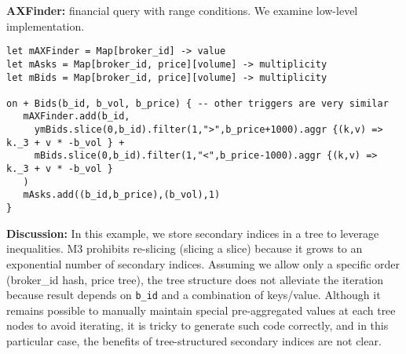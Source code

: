 \documentclass[10pt]{article}
\newlength{\dlen}
\def\discuss#1{\par\hspace{2em}
\setlength{\dlen}{\textwidth}
\addtolength{\dlen}{-2em}
\begin{minipage}{\dlen}\footnotesize {\bf\color{red} Discussion:} #1\end{minipage}\par}
\begin{document}
\textbf{AXFinder:} financial query with range conditions. We examine low-level implementation.
\begin{verbatim}
let mAXFinder = Map[broker_id] -> value
let mAsks = Map[broker_id, price][volume] -> multiplicity
let mBids = Map[broker_id, price][volume] -> multiplicity

on + Bids(b_id, b_vol, b_price) { -- other triggers are very similar
   mAXFinder.add(b_id, 
     ymBids.slice(0,b_id).filter(1,">",b_price+1000).aggr {(k,v) =>  k._3 + v * -b_vol } +
     mBids.slice(0,b_id).filter(1,"<",b_price-1000).aggr {(k,v) =>  k._3 + v * -b_vol }
   )
   mAsks.add((b_id,b_price),(b_vol),1)
}
\end{verbatim}
\discuss{In this example, we store secondary indices in a tree to leverage inequalities. M3 prohibits re-slicing (slicing a slice) because it grows to an exponential number of secondary indices. Assuming we allow only a specific order (broker\_id hash, price tree), the tree structure does not alleviate the iteration because result depends on {\tt b\_id} and a combination of keys/value. Although it remains possible to manually maintain special pre-aggregated values at each tree nodes to avoid iterating, it is tricky to generate such code correctly, and in this particular case, the benefits of tree-structured secondary indices are not clear.}


\end{document}
